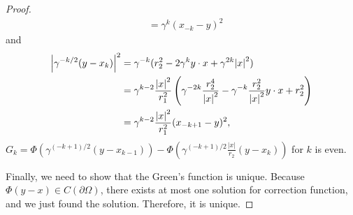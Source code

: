 \documentclass{article}
\begin{document}
\begin{proof}
\begin{equation*}
\begin{split}
&=\gamma^{k}(x_{-k}-y)^2
\end{split}
\end{equation*}
and
\begin{equation*}
\begin{split}
\abs{\gamma^{-k/2}(y-x_{k})}^2&=\gamma^{-k}(r_2^2-2\gamma^{k}y\cdot x + \gamma^{2k}\abs{x}^2) \\
&=\gamma^{k-2}\frac{\abs{x}^2}{r_1^2}\left(\gamma^{-2k}\frac{r_2^4}{\abs{x}^2}-\gamma^{-k}\frac{r_2^2}{\abs{x}^2}y\cdot x+r_2^2\right)\\
&=\gamma^{k-2}\frac{\abs{x}^2}{r_1^2}(x_{-k+1}-y)^2,
\end{split}
\end{equation*}
$G_k=\Phi\left(\gamma^{(-k+1)/2}(y-x_{k-1})\right)-\Phi\left(\gamma^{(-k+1)/2}\frac{|x|}{r_2}(y-x_k)\right)$ for $k$ is even.

Finally, we need to show that the Green's function is unique. Because $\Phi(y-x)\in C(\partial \Omega)$, there exists at most one solution for correction function, and we just found the solution. Therefore, it is unique.
\end{proof}
\end{document}
